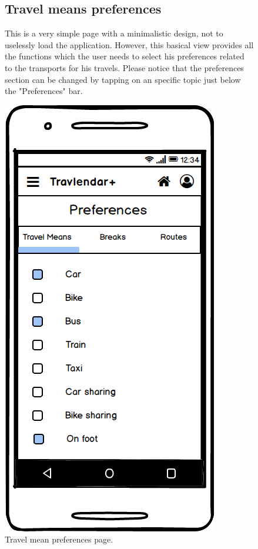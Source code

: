 	\begin{figure}
				\begin{flushleft}
				\subsection{Travel means preferences}
			This is a very simple page with a minimalistic design, not to uselessly load the application. However, this basical view provides all the functions which the user needs to select his preferences related to the transports for his travels. 
			Please notice that the preferences section can be changed by tapping on an specific topic just below the "Preferences" bar.
		\end{flushleft}
		\centering
		\includegraphics[width=0.6\linewidth]{mockups/PreferencesTravelMeans}
		\caption{Travel mean preferences page.}
		\label{fig:preferencestravelmeans}
	\end{figure}

